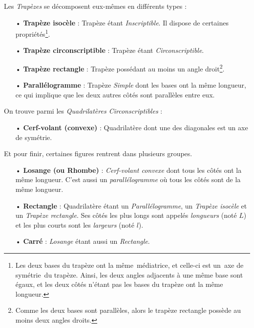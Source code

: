 \documentclass[a4paper, twoside]{article}
\begin{document}
\bigbreak

Les \emph{Trapèzes} se décomposent eux-mêmes en différents types :

\begin{itemize}
	\item[•] \textbf{Trapèze isocèle} : Trapèze étant \textit{Inscriptible}. Il dispose de certaines propriétés\footnote{
		      Les deux bases du trapèze ont la même médiatrice, et celle-ci est un axe de symétrie du trapèze.
		      Ainsi, les deux angles adjacents à une même base sont égaux,
		      et les deux côtés n'étant pas les bases du trapèze ont la même longueur.
	      }.

	\item[•] \textbf{Trapèze circonscriptible} : Trapèze étant \textit{Circonscriptible}.
	\item[•] \textbf{Trapèze rectangle} : Trapèze possédant au moins un angle droit\footnote{Comme
		      les deux bases sont parallèles,
		      alors le trapèze rectangle possède au moins deux angles droits.}.
	\item[•] \textbf{Parallélogramme} : Trapèze \textit{Simple} dont les bases ont la même longueur,
	      ce qui implique que les deux autres côtés sont parallèles entre eux.
\end{itemize}

\bigbreak

On trouve parmi les \emph{Quadrilatères Circonscriptibles} :

\begin{itemize}
	\item[•] \textbf{Cerf-volant (convexe)} : Quadrilatère dont une des diagonales est un axe de symétrie.
\end{itemize}

\bigbreak

Et pour finir, certaines figures rentrent dans plusieurs groupes.

\begin{itemize}
	\item[•] \textbf{Losange (ou Rhombe)} : \textit{Cerf-volant convexe} dont tous les côtés ont la même longueur. C'est aussi un \textit{parallélogramme} où tous les côtés sont de la même longueur.
	\item[•] \textbf{Rectangle} : Quadrilatère étant un \textit{Parallélogramme}, un \textit{Trapèze isocèle} et un \textit{Trapèze rectangle}.
	      Ses côtés les plus longs sont appelés \emph{longueurs} (noté $L$) et les plus courts sont les \emph{largeurs} (noté $l$).
	\item[•] \textbf{Carré} : \textit{Losange} étant aussi un \textit{Rectangle}.
\end{itemize}
\end{document}
